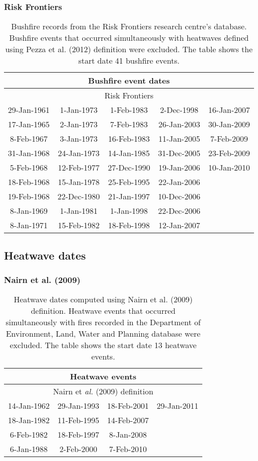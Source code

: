 \subsubsection{Risk Frontiers }

\begin{table}[H]
\caption{Bushfire records from the Risk Frontiers research centre's database.
Bushfire events that occurred simultaneously with heatwaves defined
using Pezza et al. (2012) definition were excluded. The table shows
the start date 41 bushfire events.}


\centering{}%
\begin{tabular}{|c|c|c|c|c|}
\hline 
\multicolumn{5}{|c|}{\textbf{Bushfire event dates}}\tabularnewline
\hline 
\hline 
\multicolumn{5}{|c|}{Risk Frontiers}\tabularnewline
\hline 
29-Jan-1961 & 1-Jan-1973 & 1-Feb-1983 & 2-Dec-1998 & 16-Jan-2007\tabularnewline
\hline 
17-Jan-1965 & 2-Jan-1973 & 7-Feb-1983 & 26-Jan-2003 & 30-Jan-2009\tabularnewline
\hline 
8-Feb-1967 & 3-Jan-1973 & 16-Feb-1983 & 11-Jan-2005 & 7-Feb-2009\tabularnewline
\hline 
31-Jan-1968 & 24-Jan-1973 & 14-Jan-1985 & 31-Dec-2005 & 23-Feb-2009\tabularnewline
\hline 
5-Feb-1968 & 12-Feb-1977 & 27-Dec-1990 & 19-Jan-2006 & 10-Jan-2010\tabularnewline
\hline 
18-Feb-1968 & 15-Jan-1978 & 25-Feb-1995 & 22-Jan-2006 & \tabularnewline
\hline 
19-Feb-1968 & 22-Dec-1980 & 21-Jan-1997 & 10-Dec-2006 & \tabularnewline
\hline 
8-Jan-1969 & 1-Jan-1981 & 1-Jan-1998 & 22-Dec-2006 & \tabularnewline
\hline 
8-Jan-1971 & 15-Feb-1982 & 18-Feb-1998 & 12-Jan-2007 & \tabularnewline
\hline 
\end{tabular}
\end{table}



\subsection{Heatwave dates }


\subsubsection{Nairn et al. (2009) }

\begin{table}[H]
\caption{Heatwave dates computed using Nairn et al. (2009) definition. Heatwave
events that occurred simultaneously with fires recorded in the Department
of Environment, Land, Water and Planning database were excluded. The
table shows the start date 13 heatwave events. \label{tab:Heatwave dates computed using Nairn et al. (2009) definition}}


\centering{}%
\begin{tabular}{|c|c|c|c|}
\hline 
\multicolumn{4}{|c|}{\textbf{Heatwave events }}\tabularnewline
\hline 
\hline 
\multicolumn{4}{|c|}{Nairn et \textit{al.} (2009) definition}\tabularnewline
\hline 
14-Jan-1962 & 29-Jan-1993 & 18-Feb-2001 & 29-Jan-2011\tabularnewline
\hline 
18-Jan-1982 & 11-Feb-1995 & 14-Feb-2007 & \tabularnewline
\hline 
6-Feb-1982 & 18-Feb-1997 & 8-Jan-2008 & \tabularnewline
\hline 
6-Jan-1988 & 2-Feb-2000 & 7-Feb-2010 & \tabularnewline
\hline 
\end{tabular}
\end{table}



